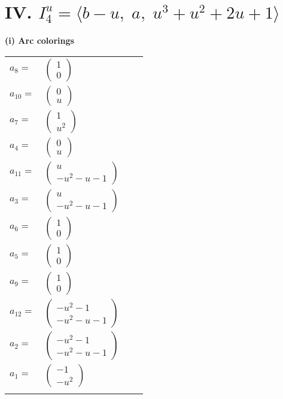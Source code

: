 \documentclass[1p]{elsarticle_modified}
\theoremstyle{definition}
\begin{document}
\centering \section*{IV. $I^u_{4}= \langle b- u,\;a,\;u^3+u^2+2 u+1 \rangle$}
\flushleft \textbf{(i) Arc colorings}\\
\begin{tabular}{m{7pt} m{180pt} m{7pt} m{180pt} }
\flushright $a_{8}=$&$\begin{pmatrix}1\\0\end{pmatrix}$ \\
\flushright $a_{10}=$&$\begin{pmatrix}0\\u\end{pmatrix}$ \\
\flushright $a_{7}=$&$\begin{pmatrix}1\\u^2\end{pmatrix}$ \\
\flushright $a_{4}=$&$\begin{pmatrix}0\\u\end{pmatrix}$ \\
\flushright $a_{11}=$&$\begin{pmatrix}u\\- u^2- u-1\end{pmatrix}$ \\
\flushright $a_{3}=$&$\begin{pmatrix}u\\- u^2- u-1\end{pmatrix}$ \\
\flushright $a_{6}=$&$\begin{pmatrix}1\\0\end{pmatrix}$ \\
\flushright $a_{5}=$&$\begin{pmatrix}1\\0\end{pmatrix}$ \\
\flushright $a_{9}=$&$\begin{pmatrix}1\\0\end{pmatrix}$ \\
\flushright $a_{12}=$&$\begin{pmatrix}- u^2-1\\- u^2- u-1\end{pmatrix}$ \\
\flushright $a_{2}=$&$\begin{pmatrix}- u^2-1\\- u^2- u-1\end{pmatrix}$ \\
\flushright $a_{1}=$&$\begin{pmatrix}-1\\- u^2\end{pmatrix}$\\&\end{tabular}
\end{document}
